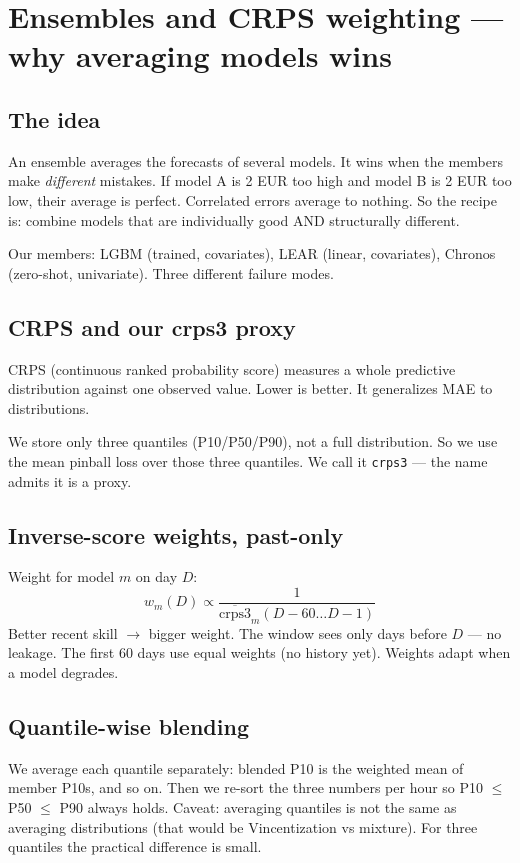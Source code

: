 \section{Ensembles and CRPS weighting --- why averaging models wins}

\subsection{The idea}

An ensemble averages the forecasts of several models.
It wins when the members make \emph{different} mistakes.
If model A is 2 EUR too high and model B is 2 EUR too low,
their average is perfect. Correlated errors average to nothing.
So the recipe is: combine models that are individually good
AND structurally different.

Our members: LGBM (trained, covariates), LEAR (linear, covariates),
Chronos (zero-shot, univariate). Three different failure modes.

\subsection{CRPS and our crps3 proxy}

CRPS (continuous ranked probability score) measures a whole
predictive distribution against one observed value.
Lower is better. It generalizes MAE to distributions.

We store only three quantiles (P10/P50/P90), not a full distribution.
So we use the mean pinball loss over those three quantiles.
We call it \texttt{crps3} --- the name admits it is a proxy.

\subsection{Inverse-score weights, past-only}

Weight for model $m$ on day $D$:
\[
w_m(D) \propto \frac{1}{\overline{\text{crps3}}_m(D-60 \dots D-1)}
\]
Better recent skill $\rightarrow$ bigger weight. The window sees only
days before $D$ --- no leakage. The first 60 days use equal weights
(no history yet). Weights adapt when a model degrades.

\subsection{Quantile-wise blending}

We average each quantile separately: blended P10 is the weighted
mean of member P10s, and so on. Then we re-sort the three numbers
per hour so P10 $\le$ P50 $\le$ P90 always holds.
Caveat: averaging quantiles is not the same as averaging
distributions (that would be Vincentization vs mixture). For three
quantiles the practical difference is small.

